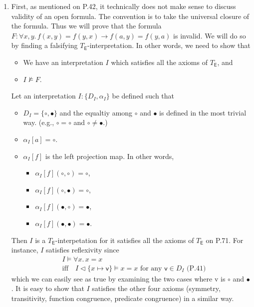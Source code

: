 \begin{exer}[3.1]
    $ $
    \begin{enumerate}[label=(\alph*)]
        \item
            First, as mentioned on P.42, it technically does not make sense to discuss validity of an open formula.
            The convention is to take the universal closure of the formula.
            Thus we will prove that the formula $F: \forall x, y.\, f(x, y) = f(y, x) \rightarrow f(a, y) = f(y, a)$ is invalid.
            We will do so by finding a falsifying $T_{\textsf{E}}$-interpretation.
            In other words, we need to show that
            \begin{itemize}
                \item
                    We have an interpretation $I$ which satisfies all the axioms of $T_{\textsf{E}}$, and
                \item
                    $I \not\models F$.
            \end{itemize}
            Let an interpretation $I: \{ D_I, \alpha_I \}$ be defined such that
            \begin{itemize}
                \item
                    $D_I = \{ \circ, \bullet \}$ and the equaltiy among $\circ$ and $\bullet$ is defined in the most trivial way.
                    (e.g., $\circ = \circ$ and $\circ \ne \bullet$.)
                \item
                    $\alpha_I[a] = \circ$.
                \item
                    $\alpha_I[f]$ is the left projection map.
                    In other words,
                    \begin{itemize}
                        \item
                            $\alpha_I[f](\circ, \circ) = \circ$,
                        \item
                            $\alpha_I[f](\circ, \bullet) = \circ$,
                        \item
                            $\alpha_I[f](\bullet, \circ) = \bullet$,
                        \item
                            $\alpha_I[f](\bullet, \bullet) = \bullet$.
                    \end{itemize}
            \end{itemize}
            Then $I$ is a $T_{\textsf{E}}$-interpetation for it satisfies all the axioms of $T_{\textsf{E}}$ on P.71.
            For instance, $I$ satisfies reflexivity since
            \begin{align*}
                &I \models \forall x.\, x = x \\
                &\text{iff}\quad I \vartriangleleft \{ x \mapsto \textsf{v} \} \models x = x \text{ for any $\textsf{v} \in D_I$ (P.41)}
            \end{align*}
            which we can easily see as \textsf{true} by examining the two cases where \textsf{v} is $\circ$ and $\bullet$.
            It is easy to show that $I$ satisfies the other four axioms (symmetry, transitivity, function congruence, predicate congruence) in a similar way.


\end{enumerate}
\end{exer}
